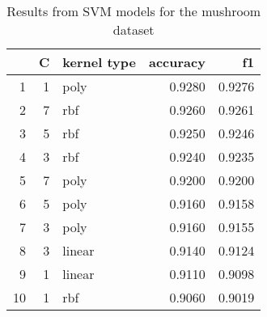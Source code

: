 \begin{table}
\caption{Results from SVM models for the mushroom dataset}
\label{tab:svm_results_mushroom}
\begin{tabular}{rrlrr}
\toprule
 & C & kernel type & accuracy & f1 \\
\midrule
1 & 1 & poly & 0.9280 & 0.9276 \\
2 & 7 & rbf & 0.9260 & 0.9261 \\
3 & 5 & rbf & 0.9250 & 0.9246 \\
4 & 3 & rbf & 0.9240 & 0.9235 \\
5 & 7 & poly & 0.9200 & 0.9200 \\
6 & 5 & poly & 0.9160 & 0.9158 \\
7 & 3 & poly & 0.9160 & 0.9155 \\
8 & 3 & linear & 0.9140 & 0.9124 \\
9 & 1 & linear & 0.9110 & 0.9098 \\
10 & 1 & rbf & 0.9060 & 0.9019 \\
\bottomrule
\end{tabular}
\end{table}

